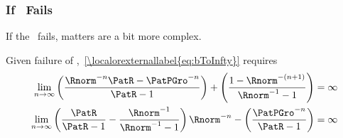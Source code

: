 \documentclass[\econtexRoot/BufferStockTheory]{subfiles}
\begin{document}

\subsubsection{If \FHWC~Fails}
If the \FHWC~fails, matters are a bit more complex.

\begin{comment}
  As noted in the main text, the Finite Value Requirement for such a consumer
  requires $\PatPGro < (\Rfree/\PGro)^{1/\CRRA}$,\footnote{A
    unique well-defined nondegenerate limiting consumption function can
    actually exist even if a nondegenerate value function does not.  But
    the parametric combinations required for this are somewhat peculiar
    (including both $\Rfree < 1$ and $\PGro < 1$); but we restrict our attention
    to the more useful and plausible cases with finite value.} which is stronger (holds
  in strictly fewer circumstances) than the \GICRaw~condition $\PatPGro < 1$.
  Thus, the \GICRaw~is an implication of $\cncl{\FHWC}$.
\end{comment}

Given failure of \FHWC,~\eqref{\localorexternallabel{eq:bToInfty}} requires
\begin{equation}\begin{gathered}\begin{aligned}
  \lim_{n \rightarrow \infty} \left(\frac{\Rnorm^{-n}\PatR-\PatPGro^{-n}}{\PatR-1}\right) + \left(\frac{1-\Rnorm^{-(n+1)}}{\Rnorm^{-1}-1}\right)  & = \infty \notag
  \\   \lim_{n \rightarrow \infty} \left(\frac{\PatR}{\PatR-1}-\frac{\Rnorm^{-1}}{\Rnorm^{-1}-1}\right)\Rnorm^{-n}-\left(\frac{\PatPGro^{-n}}{\PatR-1}\right)  & = \infty \label{eq:FHWCfails} 
\end{aligned}\end{gathered}\end{equation}
\hypertarget{PFGICHoldsFHWCFailsRICFailsDiscuss}{}
\end{document}
